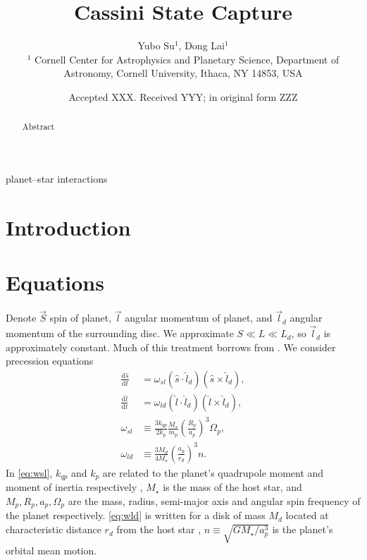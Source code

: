 \documentclass[
        fleqn,
        usenatbib,
    ]{mnras}
\title[Cassini State Capture]{Cassini State Capture}
\author[Y. Su et\ al.]{
Yubo Su$^1$,
Dong Lai$^1$
\\
$^1$ Cornell Center for Astrophysics and Planetary Science, Department of
Astronomy, Cornell University, Ithaca, NY 14853, USA
}
\date{Accepted XXX\@. Received YYY\@; in original form ZZZ}
\newcommand*{\rd}[2]{\frac{\mathrm{d}#1}{\mathrm{d}#2}}
\newcommand*{\p}[1]{\left(#1\right)}
\begin{document}
\label{firstpage}
\pagerange{\pageref{firstpage}--\pageref{lastpage}}
\renewcommand*{\sectionautorefname}{Section}
\maketitle


\begin{abstract}
    Abstract
\end{abstract}

\begin{keywords}
planet--star interactions %
\end{keywords}

\section{Introduction}

\section{Equations}\label{s:eq}

Denote $\vec{S}$ spin of planet, $\vec{l}$ angular momentum of planet, and
$\vec{l}_d$ angular momentum of the surrounding disc. We approximate $S \ll L
\ll L_d$, so $\vec{l}_d$ is approximately constant. Much of this treatment
borrows from \citep{anderson2018teeter}. We consider precession equations
\begin{align}
    \rd{\hat{s}}{t} &= \omega_{sl} \p{\hat{s} \cdot \hat{l}_d}
        \p{\hat{s} \times \hat{l}_d},\label{eq:dsdt}\\
    \rd{\hat{l}}{t} &= \omega_{ld}\p{\hat{l} \cdot \hat{l}_d}
        \p{\hat{l} \times \hat{l}_d},\label{eq:dldt}\\
    \omega_{sl} &\equiv \frac{3k_{qp}}{2k_p} \frac{M_\star}{m_p}
        \p{\frac{R_p}{a_p}}^3 \Omega_p,\label{eq:wsl}\\
    \omega_{ld} &\equiv \frac{3M_d}{4M_\star}\p{\frac{a_p}{r_d}}^3 n
        .\label{eq:wld}
\end{align}
In \autoref{eq:wsl}, $k_{qp}$ and $k_p$ are related to the planet's quadrupole
moment and moment of inertia respectively \citep[see][]{lai2018}, $M_\star$ is
the mass of the host star, and $M_p, R_p, a_p, \Omega_p$ are the mass, radius,
semi-major axis and angular spin frequency of the planet respectively.
\autoref{eq:wld} is written for a disk of mass $M_d$ located at characteristic
distance $r_d$ from the host star \citep[see][for a power-law disk
profile]{millholland_disk}, $n \equiv \sqrt{GM_\star/a_p^3}$ is the planet's
orbital mean motion.
\end{document}
